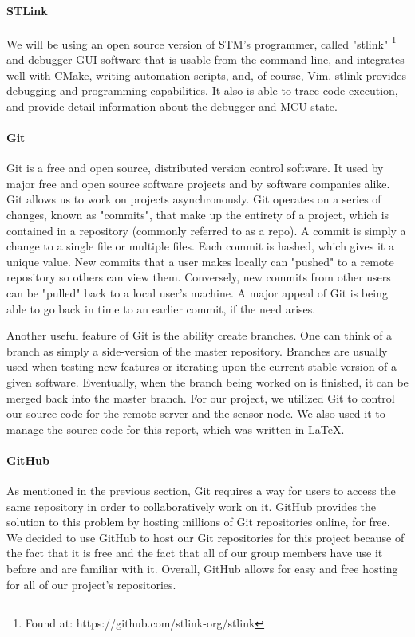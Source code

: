 \paragraph{STLink}
We will be using an open source version of STM's programmer, called "stlink"
\footnote{Found at: https://github.com/stlink-org/stlink} and debugger GUI software that is usable
from the command-line, and integrates well with CMake, writing automation scripts, and, of course,
Vim. stlink provides debugging and programming capabilities. It also is able to trace code
execution, and provide detail information about the debugger and MCU state.

\paragraph{Git}
Git is a free and open source, distributed version control software. It used by major free and open source software projects and by software companies alike. Git allows us to work on projects asynchronously. Git operates on a series of changes, known as "commits", that make up the entirety of a project, which is contained in a repository (commonly referred to as a repo). A commit is simply a change to a single file or multiple files. Each commit is hashed, which gives it a unique value. New commits that a user makes locally can "pushed" to a remote repository so others can view them. Conversely, new commits from other users can be "pulled" back to a local user's machine. A major appeal of Git is being able to go back in time to an earlier commit, if the need arises. 

Another useful feature of Git is the ability create branches. One can think of a branch as simply a side-version of the master repository. Branches are usually used when testing new features or iterating upon the current stable version of a given software. Eventually, when the branch being worked on is finished, it can be merged back into the master branch. For our project, we utilized Git to control our source code for the remote server and the sensor node. We also used it to manage the source code for this report, which was written in LaTeX.

\paragraph{GitHub}
As mentioned in the previous section, Git requires a way for users to access the same repository in order to collaboratively work on it. GitHub provides the solution to this problem by hosting millions of Git repositories online, for free. We decided to use GitHub to host our Git repositories for this project because of the fact that it is free and the fact that all of our group members have use it before and are familiar with it. Overall, GitHub allows for easy and free hosting for all of our project's repositories.

